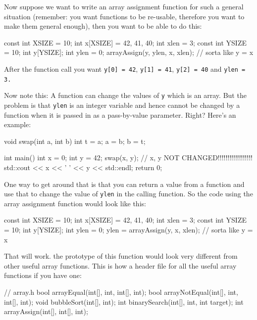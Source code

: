 Now suppose we want to write an array assignment function for such a general situation (remember: you want functions to be re-usable, therefore you want to make them general enough), then you want to be able to do this:

\begin{consolethree}[escapeinside=||]
const int XSIZE = 10;
int x[XSIZE] = {42, 41, 40};
int xlen = 3;
const int YSIZE = 10;
int y[YSIZE];
int ylen = 0;
arrayAssign(y, ylen, x, xlen); // sorta like y = x
\end{consolethree}

After the function call you want \texttt{y[0] = 42}, \texttt{y[1] =
41}, \texttt{y[2] = 40} and \texttt{ylen = 3.}

Now note this: A function can change the values of \texttt{y} which is an array. But the problem is that \texttt{ylen} is an integer variable and hence cannot be changed by a function when it is passed in as a pass-by-value parameter. Right? Here's an example:

\begin{consolethree}[escapeinside=||]
void swap(int a, int b)
{
    int t = a;
    a = b;
    b = t;
}

int main()
{
    int x = 0;
    int y = 42;
    swap(x, y); // x, y NOT CHANGED!!!!!!!!!!!!!!!!!!
    std::cout << x << ' ' << y << std::endl;
    return 0;
}
\end{consolethree}

One way to get around that is that you can return a value from a function and use that to change the value of \texttt{ylen} in the calling function. So the code using the array assignment function would look like this:

\begin{consolethree}[escapeinside=||]
const int XSIZE = 10;
int x[XSIZE] = {42, 41, 40};
int xlen = 3;
const int YSIZE = 10;
int y[YSIZE];
int ylen = 0;
ylen = arrayAssign(y, x, xlen); // sorta like y = x
\end{consolethree}

That will work.  the prototype of this function would look very different from other useful array functions. This is how a header file for all the useful array functions if you have one:

\begin{consolethree}[escapeinside=||]
// array.h
bool arrayEqual(int[], int, int[], int);
bool arrayNotEqual(int[], int, int[], int);
void bubbleSort(int[], int);
int binarySearch(int[], int, int target);
int arrayAssign(int[], int[], int);
\end{consolethree}

